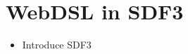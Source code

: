 
\chapter{\label{chap:sdf3}WebDSL in SDF3}

  \begin{itemize}
    \item Introduce SDF3
  \end{itemize}
